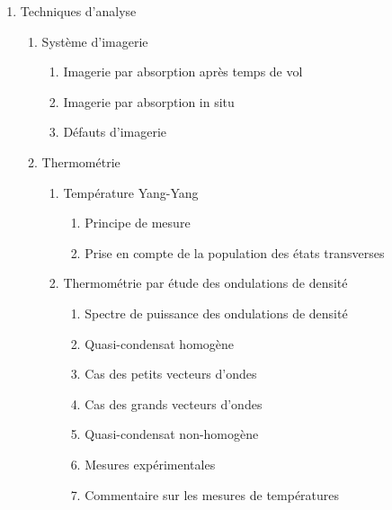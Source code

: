 \documentclass[8pt, landscape]{report}
\begin{document}
\begin{multicols}{3}
\begin{enumerate}
    \item Techniques d’analyse
    \begin{enumerate}
        \item Système d’imagerie
        \begin{enumerate}
            \item Imagerie par absorption après temps de vol
            \item Imagerie par absorption in situ
            \item Défauts d’imagerie
        \end{enumerate}
        \item Thermométrie
        \begin{enumerate}
            \item Température Yang-Yang
            \begin{enumerate}
                \item Principe de mesure
                \item Prise en compte de la population des états transverses
            \end{enumerate}
            \item Thermométrie par étude des ondulations de densité
            \begin{enumerate}
                \item Spectre de puissance des ondulations de densité
                \item Quasi-condensat homogène
                \item Cas des petits vecteurs d’ondes
                \item Cas des grands vecteurs d’ondes
                \item Quasi-condensat non-homogène
                \item Mesures expérimentales
                \item Commentaire sur les mesures de températures
            \end{enumerate}
        \end{enumerate}
    \end{enumerate}


\end{enumerate}
\end{multicols}
\end{document}
